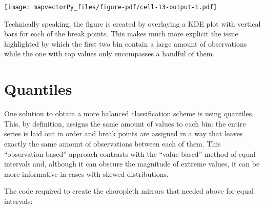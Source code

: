 \documentclass[
  letterpaper,
  DIV=11,
  numbers=noendperiod]{scrreprt}
\begin{document}
\texttt{[image: mapvectorPy\_files/figure-pdf/cell-13-output-1.pdf]}

Technically speaking, the figure is created by overlaying a KDE plot
with vertical bars for each of the break points. This makes much more
explicit the issue highlighted by which the first two bin contain a
large amount of observations while the one with top values only
encompasses a handful of them.

\section*{Quantiles}\label{quantiles}


One solution to obtain a more balanced classification scheme is using
quantiles. This, by definition, assigns the same amount of values to
each bin: the entire series is laid out in order and break points are
assigned in a way that leaves exactly the same amount of observations
between each of them. This ``observation-based'' approach contrasts with
the ``value-based'' method of equal intervals and, although it can
obscure the magnitude of extreme values, it can be more informative in
cases with skewed distributions.

The code required to create the choropleth mirrors that needed above for
equal intervals:
\end{document}
